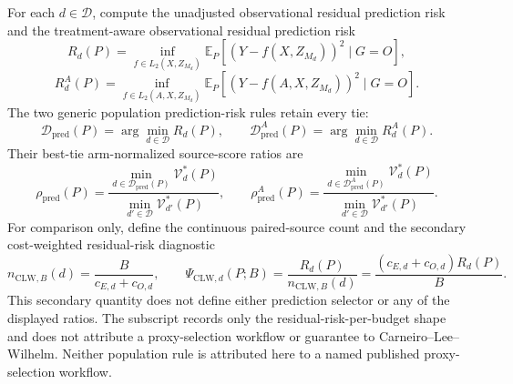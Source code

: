 For each \(d\in\mathcal D\), compute the unadjusted observational residual prediction risk and the treatment-aware observational residual prediction risk
\[
R_d(P)=\inf_{f\in L_2(X,Z_{M_d})}\mathbb E_P[(Y-f(X,Z_{M_d}))^2\mid G=O],
\]
\[
R_d^A(P)=\inf_{f\in L_2(A,X,Z_{M_d})}\mathbb E_P[(Y-f(A,X,Z_{M_d}))^2\mid G=O].
\]
The two generic population prediction-risk rules retain every tie:
\[
\mathcal D_{\mathrm{pred}}(P)=\arg\min_{d\in\mathcal D}R_d(P),
\qquad
\mathcal D_{\mathrm{pred}}^A(P)=\arg\min_{d\in\mathcal D}R_d^A(P).
\]
Their best-tie arm-normalized source-score ratios are
\[
\rho_{\mathrm{pred}}(P)=
\frac{\min_{d\in\mathcal D_{\mathrm{pred}}(P)}\mathcal V_d^*(P)}
{\min_{d'\in\mathcal D}\mathcal V_{d'}^*(P)},
\qquad
\rho_{\mathrm{pred}}^A(P)=
\frac{\min_{d\in\mathcal D_{\mathrm{pred}}^A(P)}\mathcal V_d^*(P)}
{\min_{d'\in\mathcal D}\mathcal V_{d'}^*(P)}.
\]
For comparison only, define the continuous paired-source count and the secondary cost-weighted residual-risk diagnostic
\[
n_{\mathrm{CLW},B}(d)=\frac{B}{c_{E,d}+c_{O,d}},
\qquad
\Psi_{\mathrm{CLW},d}(P;B)
=\frac{R_d(P)}{n_{\mathrm{CLW},B}(d)}
=\frac{(c_{E,d}+c_{O,d})R_d(P)}{B}.
\]
This secondary quantity does not define either prediction selector or any of the displayed ratios. The subscript records only the residual-risk-per-budget shape and does not attribute a proxy-selection workflow or guarantee to Carneiro--Lee--Wilhelm. Neither population rule is attributed here to a named published proxy-selection workflow.